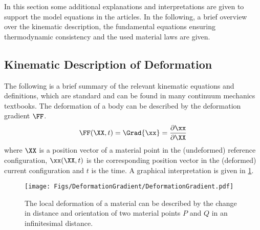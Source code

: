 In this section some additional explanations and interpretations are given to support the model equations in the articles. In the following, a brief overview over the kinematic description, the fundamental equations ensuring thermodynamic consistency and the used material laws are given. 
\subsection{Kinematic Description of Deformation}
The following is a brief summary of the relevant kinematic equations and definitions, which are standard and can be found in many continuum mechanics textbooks\supercite{haupt_continuum_2002,bonet_nonlinear_2008,altenbach_kontinuumsmechanik_2015}. The deformation of a body can be described by the deformation gradient $\FF$.  
\begin{align}
  \FF(\XX,t) = \Grad{\xx} = \frac{\partial \xx}{\partial \XX} 
\end{align}
where $\XX$ is a position vector of a material point in the (undeformed) reference configuration, $\xx(\XX,t)$ is the corresponding position vector in the (deformed) current configuration and $t$ is the time. A graphical interpretation is given in \cref{fig:DeformationGradient}. \\
\begin{figure}[h!]
  \centering
  \texttt{[image: Figs/DeformationGradient/DeformationGradient.pdf]}
  \caption[]{The local deformation of a material can be described by the change in distance and orientation of two material points $P$ and $Q$ in an infinitesimal distance. }
  \label{fig:DeformationGradient}
\end{figure}

